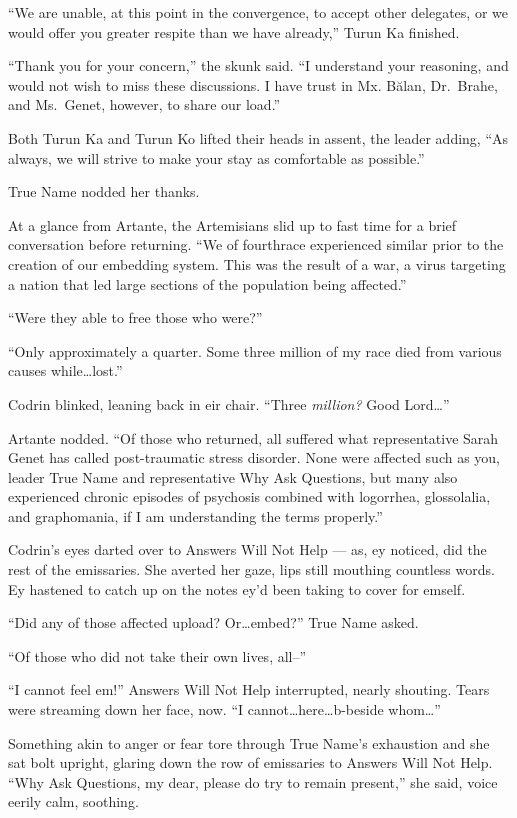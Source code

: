 ``We are unable, at this point in the convergence, to accept other delegates, or we would offer you greater respite than we have already,'' Turun Ka finished.

``Thank you for your concern,'' the skunk said. ``I understand your reasoning, and would not wish to miss these discussions. I have trust in Mx. Bălan, Dr.~Brahe, and Ms.~Genet, however, to share our load.''

Both Turun Ka and Turun Ko lifted their heads in assent, the leader adding, ``As always, we will strive to make your stay as comfortable as possible.''

True Name nodded her thanks.

At a glance from Artante, the Artemisians slid up to fast time for a brief conversation before returning. ``We of fourthrace experienced similar prior to the creation of our embedding system. This was the result of a war, a virus targeting a nation that led large sections of the population being affected.''

``Were they able to free those who were?''

``Only approximately a quarter. Some three million of my race died from various causes while\ldots lost.''

Codrin blinked, leaning back in eir chair. ``Three \emph{million?} Good Lord\ldots{}''

Artante nodded. ``Of those who returned, all suffered what representative Sarah Genet has called post-traumatic stress disorder. None were affected such as you, leader True Name and representative Why Ask Questions, but many also experienced chronic episodes of psychosis combined with logorrhea, glossolalia, and graphomania, if I am understanding the terms properly.''

Codrin's eyes darted over to Answers Will Not Help — as, ey noticed, did the rest of the emissaries. She averted her gaze, lips still mouthing countless words. Ey hastened to catch up on the notes ey'd been taking to cover for emself.

``Did any of those affected upload? Or\ldots embed?'' True Name asked.

``Of those who did not take their own lives, all--''

``I cannot feel em!'' Answers Will Not Help interrupted, nearly shouting. Tears were streaming down her face, now. ``I cannot\ldots here\ldots b-beside whom\ldots{}''

Something akin to anger or fear tore through True Name's exhaustion and she sat bolt upright, glaring down the row of emissaries to Answers Will Not Help. ``Why Ask Questions, my dear, please do try to remain present,'' she said, voice eerily calm, soothing.

